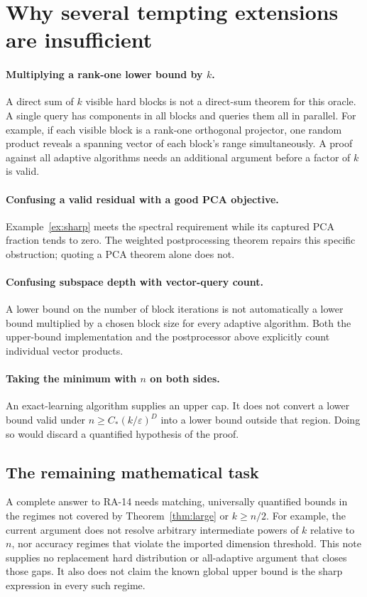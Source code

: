 \documentclass[11pt]{article}
\numberwithin{equation}{section}
\theoremstyle{definition}
\newcommand{\eps}{\varepsilon}
\begin{document}
\section{Why several tempting extensions are insufficient}
\label{sec:gaps}

\paragraph{Multiplying a rank-one lower bound by $k$.}
A direct sum of $k$ visible hard blocks is not a direct-sum theorem for this
oracle. A single query has components in all blocks and queries them all in
parallel. For example, if each visible block is a rank-one orthogonal
projector, one random product reveals a spanning vector of each block's
range simultaneously. A proof against all adaptive algorithms needs an
additional argument before a factor of $k$ is valid.

\paragraph{Confusing a valid residual with a good PCA objective.}
Example~\ref{ex:sharp} meets the spectral requirement while its captured
PCA fraction tends to zero. The weighted postprocessing theorem repairs this
specific obstruction; quoting a PCA theorem alone does not.

\paragraph{Confusing subspace depth with vector-query count.}
A lower bound on the number of block iterations is not automatically a
lower bound multiplied by a chosen block size for every adaptive algorithm.
Both the upper-bound implementation and the postprocessor above explicitly
count individual vector products.

\paragraph{Taking the minimum with $n$ on both sides.}
An exact-learning algorithm supplies an upper cap. It does not convert a
lower bound valid under $n\ge C_*(k/\eps)^D$ into a lower bound outside
that region. Doing so would discard a quantified hypothesis of the proof.

\subsection*{The remaining mathematical task}
A complete answer to RA-14 needs matching, universally quantified bounds in
the regimes not covered by Theorem~\ref{thm:large} or $k\ge n/2$.
For example, the current argument does not resolve arbitrary intermediate
powers of $k$ relative to $n$, nor accuracy regimes that violate the imported
dimension threshold. This note supplies no replacement hard distribution or
all-adaptive argument that closes those gaps. It also does not claim the
known global upper bound is the sharp expression in every such regime.
\end{document}
